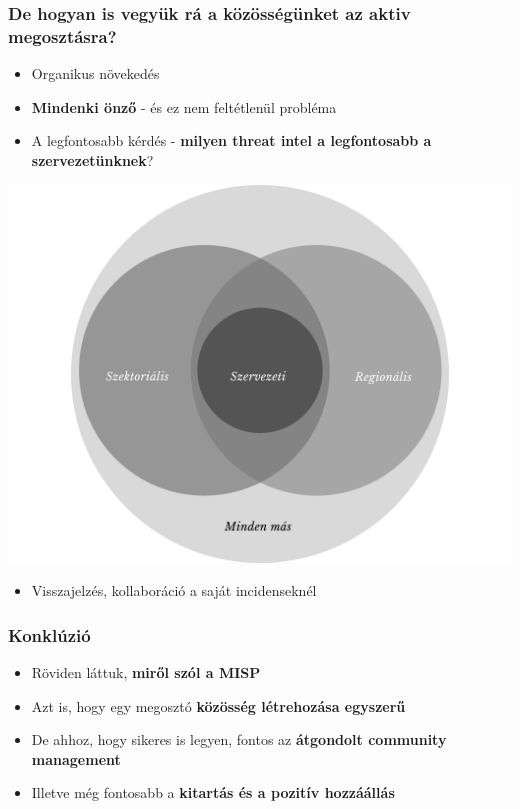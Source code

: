 \begin{frame}
  \frametitle{De hogyan is vegyük rá a közösségünket az aktiv megosztásra?}
  \begin{itemize}
      \item Organikus növekedés
      \item {\bf Mindenki önző} - és ez nem feltétlenül probléma
      \item A legfontosabb kérdés - {\bf milyen threat intel a legfontosabb a szervezetünknek}?
  \end{itemize}
  \begin{center}
    \includegraphics[scale=0.2]{pics/informacio-forrasok.png}
  \end{center}
  \begin{itemize}
      \item Visszajelzés, kollaboráció a saját incidenseknél
  \end{itemize}
\end{frame}

\begin{frame}
  \frametitle{Konklúzió}
  \begin{itemize}
      \item Röviden láttuk, {\bf miről szól a MISP}
      \item Azt is, hogy egy megosztó {\bf közösség létrehozása egyszerű}
      \item De ahhoz, hogy sikeres is legyen, fontos az {\bf átgondolt community management}
      \item Illetve még fontosabb a {\bf kitartás és a pozitív hozzáállás}
  \end{itemize}
\end{frame}


